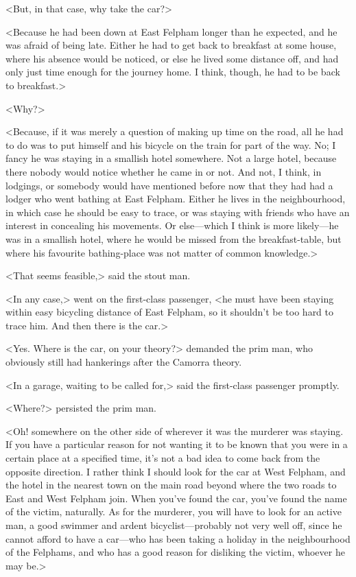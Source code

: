<But, in that case, why take the car?>

<Because he had been down at East Felpham longer than he expected, and he was afraid of being late. Either he had to get back to breakfast at some house, where his absence would be noticed, or else he lived some distance off, and had only just time enough for the journey home. I think, though, he had to be back to breakfast.>

<Why?>

<Because, if it was merely a question of making up time on the road, all he had to do was to put himself and his bicycle on the train for part of the way. No; I fancy he was staying in a smallish hotel somewhere. Not a large hotel, because there nobody would notice whether he came in or not. And not, I think, in lodgings, or somebody would have mentioned before now that they had had a lodger who went bathing at East Felpham. Either he lives in the neighbourhood, in which case he should be easy to trace, or was staying with friends who have an interest in concealing his movements. Or else—which I think is more likely—he was in a smallish hotel, where he would be missed from the breakfast-table, but where his favourite bathing-place was not matter of common knowledge.>

<That seems feasible,> said the stout man.

<In any case,> went on the first-class passenger, <he must have been staying within easy bicycling distance of East Felpham, so it shouldn't be too hard to trace him. And then there is the car.>

<Yes. Where is the car, on your theory?> demanded the prim man, who obviously still had hankerings after the Camorra theory.

<In a garage, waiting to be called for,> said the first-class passenger promptly.

<Where?> persisted the prim man.

<Oh! somewhere on the other side of wherever it was the murderer was staying. If you have a particular reason for not wanting it to be known that you were in a certain place at a specified time, it's not a bad idea to come back from the opposite direction. I rather think I should look for the car at West Felpham, and the hotel in the nearest town on the main road beyond where the two roads to East and West Felpham join. When you've found the car, you've found the name of the victim, naturally. As for the murderer, you will have to look for an active man, a good swimmer and ardent bicyclist—probably not very well off, since he cannot afford to have a car—who has been taking a holiday in the neighbourhood of the Felphams, and who has a good reason for disliking the victim, whoever he may be.>

